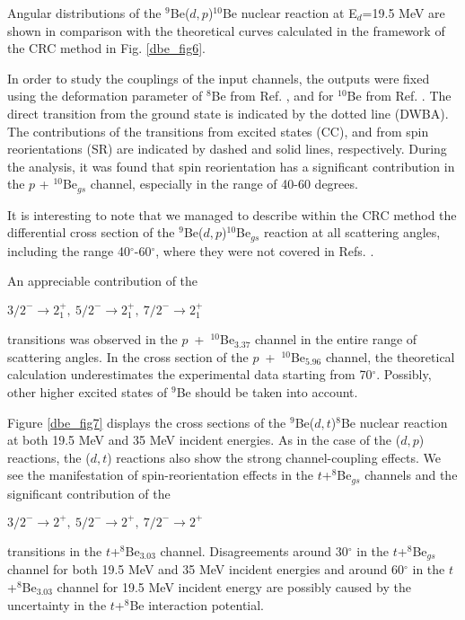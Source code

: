 \documentclass[
12pt, %
oneside, %
english, %
doublespacing, %
doublespacing, %
toctotoc, %
parskip, %
headsepline, %
]{MastersDoctoralThesis} %
\begin{document}
Angular distributions of the ${}^9$Be($d,p$)${}^{10}$Be nuclear reaction at E$_d$=19.5 MeV are shown in comparison with the theoretical curves  calculated in the framework of the CRC method in Fig. \ref{dbe_fig6}.

In order to study the couplings of the input  channels, the outputs  were fixed using the deformation parameter of $^8$Be from Ref. \cite{rocca2018}, and for $^{10}$Be from Ref. \cite{harakeh1980strong}. 
The direct transition from the ground state is indicated by the dotted line (DWBA). 
The contributions of the transitions from excited states (CC), and from spin reorientations (SR) are indicated by dashed and solid lines, respectively.
During the analysis, it was found that spin reorientation has a significant contribution in the $p$ + $^{10}$Be$_{gs}$ channel, especially in the range of 40-60 degrees. 

It is interesting to note that we managed to describe within the CRC method the differential cross section of the ${}^9$Be($d,p$)${}^{10}$Be$_{gs}$ reaction at all scattering angles, including the range 40$^\circ$-60$^\circ$, where they were not covered in Refs. \cite{galanina2012, bodek1989}.
 
An appreciable contribution of the \begin{small}
$3/2^- \rightarrow 2^+_1,~5/2^- \rightarrow 2^+_1,~7/2^-\rightarrow 2^+_1$
\end{small} transitions was observed in the $p$~+~$^{10}$Be$_{3.37}$ channel in the entire range of scattering angles. 
In the cross section of the  $p$~+~$^{10}$Be$_{5.96}$ channel, the theoretical calculation underestimates the experimental data starting from 70$^\circ$. Possibly, other higher excited states of $^9$Be should be taken into account.

Figure \ref{dbe_fig7} displays the cross sections of the ${}^9$Be($d,t$)${}^{8}$Be nuclear reaction at both 19.5 MeV and 35 MeV incident energies. As in the case of the ($d,p$) reactions, the ($d,t$) reactions also show the strong channel-coupling effects. We see the manifestation of spin-reorientation effects in the $t$+$^8$Be$_{gs}$ channels and the significant contribution of the  \begin{small}
$3/2^- \rightarrow 2^+,~ 5/2^- \rightarrow 2^+,~ 7/2^-\rightarrow 2^+$
\end{small} transitions in the $t$+$^8$Be$_{3.03}$ channel.
Disagreements around 30$^\circ$ in the $t$+$^8$Be$_{gs}$ channel for both 19.5 MeV and 35 MeV incident energies and around 60$^\circ$ in the $t$+$^8$Be$_{3.03}$ channel for 19.5 MeV incident energy are possibly caused by the uncertainty in the $t$+$^8$Be interaction potential.
\end{document}
